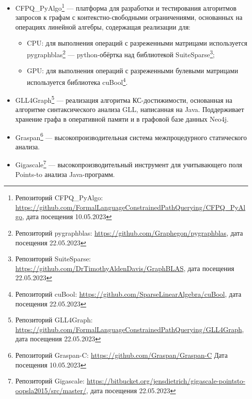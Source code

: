 \begin{itemize}
    \item CFPQ\_PyAlgo\footnote{Репозиторий CFPQ\_PyAlgo: \url{https://github.com/FormalLanguageConstrainedPathQuerying/CFPQ_PyAlgo}, дата посещения 10.05.2023} --- платформа для разработки и тестирования алгоритмов запросов к графам с контекстно-свободными ограничениями, основанных на операциях линейной алгебры, содержащая реализации для: %
    \begin{itemize}
        \item CPU: для выполнения операций с разреженными матрицами используется pygraphblas\footnote{Репозиторий pygraphblas: \url{https://github.com/Graphegon/pygraphblas}, дата посещения 22.05.2023} --- python-обёртка над библиотекой SuiteSparse\footnote{Репозиторий SuiteSparse: \url{https://github.com/DrTimothyAldenDavis/GraphBLAS}, дата посещения 22.05.2023};
        \item GPU: для выполнения операций с разреженными булевыми матрицами используется библиотека cuBool\footnote{Репозиторий cuBool: \url{https://github.com/SparseLinearAlgebra/cuBool}, дата посещения 22.05.2023}.
    \end{itemize}
    \item GLL4Graph\footnote{Репозиторий GLL4Graph: \url{https://github.com/FormalLanguageConstrainedPathQuerying/GLL4Graph}, дата посещения 22.05.2023} --- реализация алгоритма КС-достижимости, основанная на алгоритме синтаксического анализа GLL, написанная на Java. Поддерживает хранение графа в оперативной памяти и в графовой базе данных Neo4j.
    \item Graspan\footnote{Репозиторий Graspan-C: \url{https://github.com/Graspan/Graspan-C} Дата посещения 10.05.2023} --- высокопроизводительная система межпроцедурного статического анализа.
    \item Gigascale\footnote{Репозиторий Gigascale: \url{https://bitbucket.org/jensdietrich/gigascale-pointsto-oopsla2015/src/master/}, дата посещения 22.05.2023} --- высокопроизводительный инструмент для учитывающего поля Points-to анализа Java-программ. 
\end{itemize}
